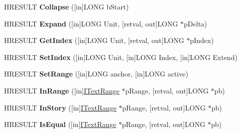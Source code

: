 \begin{DoxyCompactItemize}
\item 
\mbox{\label{interface_i_text_range_ab30c9e85a07eb1229d5e6750abf28eb4}} 
H\+R\+E\+S\+U\+LT {\bfseries Collapse} (\mbox{[}in\mbox{]}L\+O\+NG b\+Start)
\item 
\mbox{\label{interface_i_text_range_a6dc3a2b5bf0de680f69146db5cb51dc0}} 
H\+R\+E\+S\+U\+LT {\bfseries Expand} (\mbox{[}in\mbox{]}L\+O\+NG Unit, \mbox{[}retval, out\mbox{]}L\+O\+NG $\ast$p\+Delta)
\item 
\mbox{\label{interface_i_text_range_a3e161368f64dc94c7cd76c5a8742cfd5}} 
H\+R\+E\+S\+U\+LT {\bfseries Get\+Index} (\mbox{[}in\mbox{]}L\+O\+NG Unit, \mbox{[}retval, out\mbox{]}L\+O\+NG $\ast$p\+Index)
\item 
\mbox{\label{interface_i_text_range_a57e16cab966ac3192560ae1815b2c15e}} 
H\+R\+E\+S\+U\+LT {\bfseries Set\+Index} (\mbox{[}in\mbox{]}L\+O\+NG Unit, \mbox{[}in\mbox{]}L\+O\+NG Index, \mbox{[}in\mbox{]}L\+O\+NG Extend)
\item 
\mbox{\label{interface_i_text_range_ad64fd90b79df56dfd64a282594dd0abc}} 
H\+R\+E\+S\+U\+LT {\bfseries Set\+Range} (\mbox{[}in\mbox{]}L\+O\+NG anchor, \mbox{[}in\mbox{]}L\+O\+NG active)
\item 
\mbox{\label{interface_i_text_range_aacb3f095744614cd9e905ade17f41316}} 
H\+R\+E\+S\+U\+LT {\bfseries In\+Range} (\mbox{[}in\mbox{]}\hyperlink{interface_i_text_range}{I\+Text\+Range} $\ast$p\+Range, \mbox{[}retval, out\mbox{]}L\+O\+NG $\ast$pb)
\item 
\mbox{\label{interface_i_text_range_a0347022370d904c3c690a7b6eba5c589}} 
H\+R\+E\+S\+U\+LT {\bfseries In\+Story} (\mbox{[}in\mbox{]}\hyperlink{interface_i_text_range}{I\+Text\+Range} $\ast$p\+Range, \mbox{[}retval, out\mbox{]}L\+O\+NG $\ast$pb)
\item 
\mbox{\label{interface_i_text_range_abc7d8d36e1e6fadbf289e6becbe09d72}} 
H\+R\+E\+S\+U\+LT {\bfseries Is\+Equal} (\mbox{[}in\mbox{]}\hyperlink{interface_i_text_range}{I\+Text\+Range} $\ast$p\+Range, \mbox{[}retval, out\mbox{]}L\+O\+NG $\ast$pb)

\end{DoxyCompactItemize}
